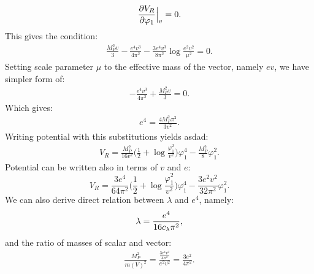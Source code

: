 \begin{align}
\frac{\partial V_R}{\partial \varphi_1} \Big|_v= 0.
\end{align}
This gives the condition:
\begin{align}
\frac{M_P^2v}{3}-\frac{e^4v^3}{4\pi^2}-\frac{3e^4v^3}{8\pi^2}\log\frac{e^2v^2}{\mu^2}=0.
\end{align}
Setting scale parameter $\mu$ to the effective mass of the vector, namely $ev$, we have 
simpler form of:
\begin{align}
-\frac{e^4v^3}{4\pi^2}+\frac{M_P^2v}{3}=0.
\end{align}
Which gives:
\begin{align}
e^4 = \frac{4M_P^2\pi^2}{3v^2}.
\end{align}
Writing potential with this substitutions yields asdad:
\begin{align}
V_R = \frac{M_P^2}{16v^2}\Big(\frac{1}{2}+\log\frac{\varphi_1^2}{v^2}\Big)\varphi_1^4- 
\frac{M_P^2}{8}\varphi_1^2.
\end{align}
Potential can be written also in terms of $v$ and $e$:
\begin{equation}
V_R=\frac{3e^4}{64\pi^2}\Big(\frac{1}{2}+\log\frac{\varphi_1^2}{v^2}\Big)\varphi_1^4- 
\frac{3e^2v^2}{32\pi^2}\varphi_1^2.
\end{equation}
We can also derive direct relation between $\lambda$ and $e^4$, namely:
\begin{align}
\lambda = \frac{e^4}{16c_\lambda\pi^2},
\end{align}
and the ratio of masses of scalar and vector:
\begin{align}
\frac{M_P^2}{m(V)^2} = \frac{\frac{3e^4v^2}{4\pi^2}}{e^2v^2} = \frac{3e^2}{4\pi^2}.
\end{align}
